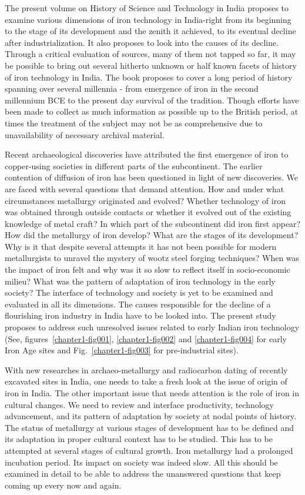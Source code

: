 The present volume on History of Science and Technology in India proposes to examine various dimensions of iron technology in India-right from its beginning to the stage of its development and the zenith it achieved, to its eventual decline after industrialization. It also proposes to look into the causes of its decline. Through a critical evaluation of sources, many of them not tapped so far, it may be possible to bring out several hitherto unknown or half known facets of history of iron technology in India. The book proposes to cover a long period of history spanning over several millennia - from emergence of iron in the second millennium BCE to the present day survival of the tradition. Though efforts have been made to collect as much information as possible up to the British period, at times the treatment of the subject may not be as comprehensive due to unavailability of necessary archival material.

Recent archaeological discoveries have attributed the first emergence of iron to copper-using societies in different parts of the subcontinent. The earlier contention of diffusion of iron has been questioned in light of new discoveries. We are faced with several questions that demand attention. How and under what circumstances metallurgy originated and evolved? Whether technology of iron was obtained through outside contacts or whether it evolved out of the existing knowledge of metal craft? In which part of the subcontinent did iron first appear? How did the metallurgy of iron develop? What are the stages of its development? Why is it that despite several attempts it has not been possible for modern metallurgists to unravel the mystery of wootz steel forging techniques? When was the impact of iron felt and why was it so slow to reflect itself in socio-economic milieu? What was the pattern of adaptation of iron technology in the early society? The interface of technology and society is yet to be examined and evaluated in all its dimensions. The causes responsible for the decline of a flourishing iron industry in India have to be looked into. The present study proposes to address such unresolved issues related to early Indian iron technology (See, figures~{\ref{chapter1-fig001}}, \ref{chapter1-fig002} and \ref{chapter1-fig004} for early Iron Age sites and Fig.~\ref{chapter1-fig003} for pre-industrial sites). 

\newpage

With new researches in archaeo-metallurgy and radiocarbon dating of recently excavated sites in India, one needs to take a fresh look at the issue of origin of iron in India. The other important issue that needs attention is the role of iron in cultural changes. We need to review and interface productivity, technology advancement, and its pattern of adaptation by society at nodal points of history. The status of metallurgy at various stages of development has to be defined and its adaptation in proper cultural context has to be studied. This has to be attempted at several stages of cultural growth. Iron metallurgy had a prolonged incubation period. Its impact on society was indeed slow. All this should be examined in detail to be able to address the unanswered questions that keep coming up every now and again. 

